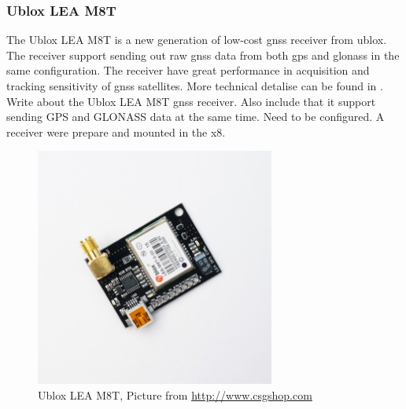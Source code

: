 \subsubsection{Ublox LEA M8T}
The Ublox LEA M8T is a new generation of low-cost \gls{gnss} receiver from ublox. The receiver support sending out raw \gls{gnss} data from both \gls{gps} and \gls{glonass} in the same configuration. The receiver have great performance in acquisition and tracking sensitivity of \gls{gnss} satellites. More technical detalise can be found in  \citep{UbloxDataSheet,UbloxReceiverDescription}.
Write about the Ublox LEA M8T gnss receiver. Also include that it support sending GPS and GLONASS data at the same time. Need to be configured. A receiver were prepare and mounted in the x8.
\begin{figure}[H]
	\centering
		\includegraphics[width=0.7\textwidth]{figs/ubloxLeaM8T.jpg}
		\caption{Ublox LEA M8T, Picture from \url{http://www.csgshop.com}}
		\label{figure:Ublox}
\end{figure}

